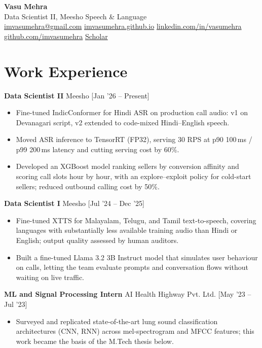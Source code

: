 \documentclass[a4paper,10pt]{article}
\newcommand{\role}[3]{\noindent\textbf{#1} \textbar{} #2 \hfill [#3]\par}
\begin{document}
\begin{center}
  {\LARGE \textbf{Vasu Mehra}}\\[0.35em]
  Data Scientist II, Meesho \textbar{} Speech \& Language\\[0.25em]
  \href{mailto:imvasumehra@gmail.com}{imvasumehra@gmail.com} \textbar{}
  \href{https://imvasumehra.github.io}{imvasumehra.github.io} \textbar{}
  \href{https://www.linkedin.com/in/vasumehra/}{linkedin.com/in/vasumehra} \textbar{}
  \href{https://github.com/imvasumehra}{github.com/imvasumehra} \textbar{}
  \href{https://scholar.google.com/citations?user=7qZykZsAAAAJ&hl=en}{Scholar}
\end{center}

\section{Work Experience}

\role{Data Scientist II}{Meesho}{Jan '26 -- Present}
\begin{itemize}
  \item Fine-tuned IndicConformer for Hindi ASR on production call audio: v1 on Devanagari script, v2 extended to code-mixed Hindi--English speech.
  \item Moved ASR inference to TensorRT (FP32), serving 30 RPS at p90 100\,ms / p99 200\,ms latency and cutting serving cost by 60\%.
  \item Developed an XGBoost model ranking sellers by conversion affinity and scoring call slots hour by hour, with an explore--exploit policy for cold-start sellers; reduced outbound calling cost by 50\%.
\end{itemize}

\role{Data Scientist I}{Meesho}{Jul '24 -- Dec '25}
\begin{itemize}
  \item Fine-tuned XTTS for Malayalam, Telugu, and Tamil text-to-speech, covering languages with substantially less available training audio than Hindi or English; output quality assessed by human auditors.
  \item Built a fine-tuned Llama 3.2 3B Instruct model that simulates user behaviour on calls, letting the team evaluate prompts and conversation flows without waiting on live traffic.
\end{itemize}

\role{ML and Signal Processing Intern}{AI Health Highway Pvt. Ltd.}{May '23 -- Jul '23}
\begin{itemize}
  \item Surveyed and replicated state-of-the-art lung sound classification architectures (CNN, RNN) across mel-spectrogram and MFCC features; this work became the basis of the M.Tech thesis below.
\end{itemize}
\end{document}
